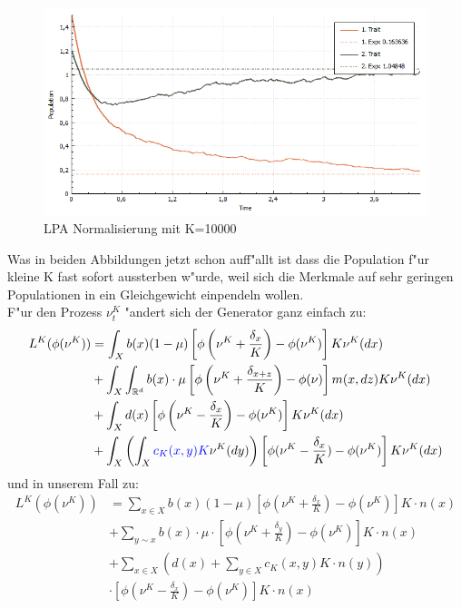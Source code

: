 \documentclass[11pt, a4paper, german]{article}
\theoremstyle{plain}
\begin{document}
	\begin{figure}[H]
		\centering
		\includegraphics[width=1\linewidth]{./Pictures/LPANormalisierungK10000}
		\caption[LPAK100]{LPA Normalisierung mit K=10000}
		\label{LPA Normalisierung K=10000}
	\end{figure}
	Was in beiden Abbildungen jetzt schon auff"allt ist dass die Population f"ur kleine K fast sofort aussterben w"urde, weil sich die Merkmale auf sehr geringen Populationen in ein Gleichgewicht einpendeln wollen.\\
	F"ur den Prozess $ \nu_t^K $ "andert sich der Generator ganz einfach zu:
	\begin{align*}
		L^K(\phi(\nu^K)) &= \int_{X} b(x)(1-\mu)\left[\phi\left(\nu^K + \frac{\delta_x}{K}\right) - \phi(\nu^K)\right]K\nu^K(dx)\\
			  &+ \int_{X}\int_{\mathbb{R}^d} b(x) \cdot \mu \left[\phi\left(\nu^K + \frac{\delta_{x+z}}{K}\right) - \phi(\nu)\right] m(x,dz) K \nu^K(dx)\\
		  	  &+ \int_{X} d(x)\left[\phi\left(\nu^K - \frac{\delta_x}{K}\right) - \phi(\nu^K)\right]K\nu^K(dx)\\
		 	  &+ \int_{X} \left( \int_{X} \textcolor{blue}{c_K(x,y) K} \nu^K(dy) \right) \left[\phi(\nu^K - \frac{\delta_x}{K}) - \phi(\nu^K)\right]K\nu^K(dx)
	\end{align*}
	und in unserem Fall zu:
	\begin{align*}
		L^K(\phi(\nu^K)) &= \sum_{x \in X} b(x)(1-\mu)\left[\phi\left(\nu^K + \frac{\delta_x}{K}\right) - \phi(\nu^K)\right]K \cdot n(x)\\
		&+ \sum_{y \sim x}b(x) \cdot \mu \cdot 
	 \left[\phi\left(\nu^K + \frac{\delta_y}{K}\right) - \phi(\nu^K)\right]K \cdot n(x)\\		 
		&+ \sum_{x \in X} \left(d(x) + \sum_{y \in X} c_K(x,y) K \cdot n(y)\right)\\
		&\cdot \left[\phi\left(\nu^K - \frac{\delta_x}{K}\right) - \phi(\nu^K)\right]K \cdot n(x)\\
	\end{align*}
	
\end{document}
